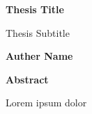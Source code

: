 \thispagestyle{plain}
\begin{center}
	\Large
	\textbf{Thesis Title}
	
	\vspace{0.4cm}
	\large
	Thesis Subtitle
	
	\vspace{0.4cm}
	\textbf{Auther Name}
	
	\vspace{0.9cm}
	\textbf{Abstract}
\end{center}

Lorem ipsum dolor